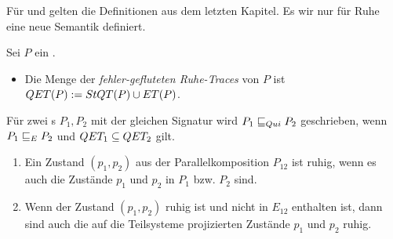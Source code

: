 Für \ET{} und \EL{} gelten die Definitionen aus dem letzten Kapitel. Es wir nur
für Ruhe eine neue Semantik definiert.

\begin{Def}
  Sei $P$ ein \MEIO{}.
  \begin{itemize}
    \item Die Menge der \emph{fehler-gefluteten Ruhe-Traces} von $P$ ist $QET
      (P):= StQT (P)\cup ET (P)$.
  \end{itemize}
  Für zwei \MEIO{}s $P_1,P_2$ mit der gleichen Signatur wird $P_1 \sqsubseteq  _{Qui}{} P_2$
  geschrieben, wenn $P_1 \sqsubseteq  _E{} P_2$ und $QET _1\subseteq QET _2$ gilt.
\end{Def}

\begin{Lem}\mbox{}
  \label{RuheZustLem}
  \begin{enumerate}
    \item Ein Zustand $(p_1,p_2)$ aus der Parallelkomposition $P_{12}$ ist
      ruhig, wenn es auch die Zustände $p_1$ und $p_2$ in $P_1$ bzw. $P_2$
      sind.
    \item Wenn der Zustand $(p_1,p_2)$ ruhig ist und nicht in $E_{12}$
      enthalten ist, dann sind auch die auf die Teilsysteme projizierten
      Zustände $p_1$ und $p_2$ ruhig.
  \end{enumerate}
\end{Lem}
